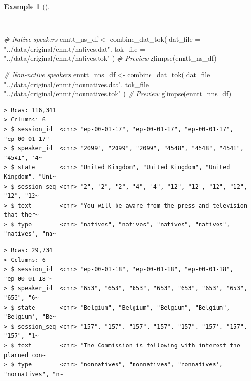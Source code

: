 \documentclass[
  letterpaper,
]{latex/krantz}
\newenvironment{Shaded}{\begin{snugshade}}{\end{snugshade}}
\newcommand{\AttributeTok}[1]{\textcolor[rgb]{0.00,0.00,0.00}{#1}}
\newcommand{\CommentTok}[1]{\textcolor[rgb]{0.00,0.00,0.00}{\textit{#1}}}
\newcommand{\FunctionTok}[1]{\textcolor[rgb]{0.00,0.00,0.00}{#1}}
\newcommand{\NormalTok}[1]{\textcolor[rgb]{0.00,0.00,0.00}{#1}}
\newcommand{\OtherTok}[1]{\textcolor[rgb]{0.00,0.00,0.00}{#1}}
\newcommand{\StringTok}[1]{\textcolor[rgb]{0.00,0.00,0.00}{#1}}
\theoremstyle{definition}
\newtheorem{example}{Example}[chapter]
\theoremstyle{remark}
\begin{document}
\begin{example}[]\protect\hypertarget{exm-cd-enntt-combine-dat-tok}{}\label{exm-cd-enntt-combine-dat-tok}

~

\begin{Shaded}
\begin{Highlighting}[]
\CommentTok{\# Native speakers}
\NormalTok{enntt\_ns\_df }\OtherTok{\textless{}{-}}
  \FunctionTok{combine\_dat\_tok}\NormalTok{(}
    \AttributeTok{dat\_file =} \StringTok{"../data/original/enntt/natives.dat"}\NormalTok{,}
    \AttributeTok{tok\_file =} \StringTok{"../data/original/enntt/natives.tok"}
\NormalTok{  )}
\CommentTok{\# Preview}
\FunctionTok{glimpse}\NormalTok{(enntt\_ns\_df)}

\CommentTok{\# Non{-}native speakers}
\NormalTok{enntt\_nns\_df }\OtherTok{\textless{}{-}}
  \FunctionTok{combine\_dat\_tok}\NormalTok{(}
    \AttributeTok{dat\_file =} \StringTok{"../data/original/enntt/nonnatives.dat"}\NormalTok{,}
    \AttributeTok{tok\_file =} \StringTok{"../data/original/enntt/nonnatives.tok"}
\NormalTok{  )}
\CommentTok{\# Preview}
\FunctionTok{glimpse}\NormalTok{(enntt\_nns\_df)}
\end{Highlighting}
\end{Shaded}

\begin{verbatim}
> Rows: 116,341
> Columns: 6
> $ session_id  <chr> "ep-00-01-17", "ep-00-01-17", "ep-00-01-17", "ep-00-01-17"~
> $ speaker_id  <chr> "2099", "2099", "2099", "4548", "4548", "4541", "4541", "4~
> $ state       <chr> "United Kingdom", "United Kingdom", "United Kingdom", "Uni~
> $ session_seq <chr> "2", "2", "2", "4", "4", "12", "12", "12", "12", "12", "12~
> $ text        <chr> "You will be aware from the press and television that ther~
> $ type        <chr> "natives", "natives", "natives", "natives", "natives", "na~
\end{verbatim}

\begin{verbatim}
> Rows: 29,734
> Columns: 6
> $ session_id  <chr> "ep-00-01-18", "ep-00-01-18", "ep-00-01-18", "ep-00-01-18"~
> $ speaker_id  <chr> "653", "653", "653", "653", "653", "653", "653", "653", "6~
> $ state       <chr> "Belgium", "Belgium", "Belgium", "Belgium", "Belgium", "Be~
> $ session_seq <chr> "157", "157", "157", "157", "157", "157", "157", "157", "1~
> $ text        <chr> "The Commission is following with interest the planned con~
> $ type        <chr> "nonnatives", "nonnatives", "nonnatives", "nonnatives", "n~
\end{verbatim}

\end{example}
\end{document}
